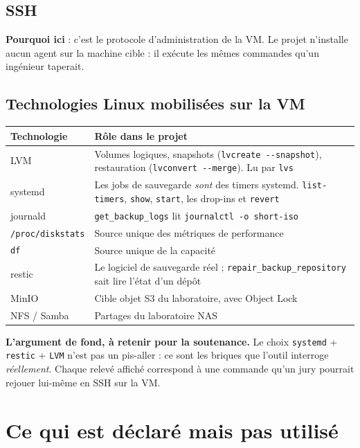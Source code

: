 \documentclass[11pt,a4paper]{report}
\newcommand{\fn}[1]{\texttt{\small\textcolor{oasisviolet}{#1}}}
\begin{document}
\subsection{SSH}
\textbf{Pourquoi ici} : c'est le protocole d'administration de la VM. Le projet
n'installe aucun agent sur la machine cible : il exécute les mêmes commandes
qu'un ingénieur taperait.

\subsection{Technologies Linux mobilisées sur la VM}

\begin{longtable}{@{}p{3.4cm}p{11.4cm}@{}}
\toprule
\textbf{Technologie} & \textbf{Rôle dans le projet}\\
\midrule
\endhead
LVM & Volumes logiques, snapshots (\texttt{lvcreate -{}-snapshot}), restauration (\texttt{lvconvert -{}-merge}). Lu par \texttt{lvs}\\
systemd & Les jobs de sauvegarde \emph{sont} des timers systemd. \texttt{list-timers}, \texttt{show}, \texttt{start}, les drop-ins et \texttt{revert}\\
journald & \fn{get\_backup\_logs} lit \texttt{journalctl -o short-iso}\\
\texttt{/proc/diskstats} & Source unique des métriques de performance\\
\texttt{df} & Source unique de la capacité\\
restic & Le logiciel de sauvegarde réel ; \fn{repair\_backup\_repository} sait lire l'état d'un dépôt\\
MinIO & Cible objet S3 du laboratoire, avec Object Lock\\
NFS / Samba & Partages du laboratoire NAS\\
\bottomrule
\end{longtable}

\begin{keybox}
\textbf{L'argument de fond, à retenir pour la soutenance.} Le choix
\texttt{systemd} + \texttt{restic} + \texttt{LVM} n'est pas un pis-aller : ce
sont les briques que l'outil interroge \emph{réellement}. Chaque relevé affiché
correspond à une commande qu'un jury pourrait rejouer lui-même en SSH sur la
VM.
\end{keybox}

\section{Ce qui est déclaré mais pas utilisé}
\end{document}
